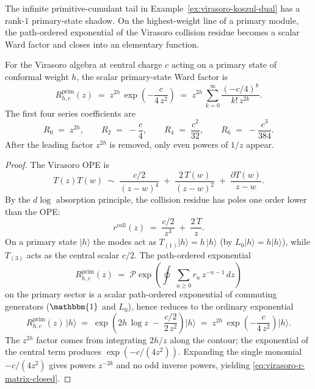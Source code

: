 The infinite primitive-cumulant tail in
Example~\ref{ex:virasoro-koszul-dual} has a rank-$1$ primary-state
shadow. On the highest-weight line of a primary module, the
path-ordered exponential of the Virasoro collision residue becomes a
scalar Ward factor and closes into an elementary function.

\begin{computation}
\label{comp:virasoro-spectral-r-matrix}
For the Virasoro algebra at central charge $c$ acting on a
primary state of conformal weight $h$, the scalar primary-state
Ward factor is
\begin{equation}
\label{eq:virasoro-r-matrix-closed}
R^{\mathrm{prim}}_{h,c}(z)
\;=\; z^{2h}\,\exp\!\left(-\frac{c}{4\,z^{2}}\right)
 \;=\; z^{2h}\,\sum_{k=0}^{\infty}
 \frac{(-c/4)^{k}}{k!\,z^{2k}}.
\end{equation}
The first four series coefficients are
\[
 R_0 \;=\; z^{2h},
 \qquad
 R_2 \;=\; -\frac{c}{4},
 \qquad
 R_4 \;=\; \frac{c^{2}}{32},
 \qquad
 R_6 \;=\; -\frac{c^{3}}{384}.
\]
After the leading factor $z^{2h}$ is removed, only even powers of
$1/z$ appear.
\end{computation}

\begin{proof}
The Virasoro OPE is
\[
 T(z)T(w) \;\sim\; \frac{c/2}{(z-w)^{4}}
 \;+\; \frac{2\,T(w)}{(z-w)^{2}}
 \;+\; \frac{\partial T(w)}{z-w}.
\]
By the $d\log$ absorption principle, the collision residue has
poles one order lower than the OPE:
\[
 r^{\mathrm{coll}}(z) \;=\; \frac{c/2}{z^{3}} \;+\; \frac{2\,T}{z}.
\]
On a primary state $\lvert h\rangle$ the modes act as
$T_{(1)}\lvert h\rangle = h\,\lvert h\rangle$ (by
$L_{0}\lvert h\rangle = h\lvert h\rangle$), while $T_{(3)}$
acts as the central scalar $c/2$. The path-ordered exponential
\[
 R^{\mathrm{prim}}_{h,c}(z)
 \;=\; \mathcal{P}\exp\!\left(\oint\;\sum_{n\geq 0}
 r_{n}\,z^{-n-1}\,dz\right)
\]
on the primary sector is a scalar path-ordered exponential of
commuting generators ($\mathbbm{1}$ and $L_{0}$), hence reduces
to the ordinary exponential
\[
 R^{\mathrm{prim}}_{h,c}(z)\,\lvert h\rangle
 \;=\; \exp\!\left(2h\,\log z \;-\; \frac{c/2}{2\,z^{2}}\right)
 \lvert h\rangle
 \;=\; z^{2h}\,\exp\!\left(-\frac{c}{4\,z^{2}}\right)
 \lvert h\rangle.
\]
The $z^{2h}$ factor comes from integrating $2h/z$ along the
contour; the exponential of the central term produces
$\exp(-c/(4z^{2}))$. Expanding the single monomial
$-c/(4z^2)$ gives powers $z^{-2k}$ and no odd inverse powers,
yielding \eqref{eq:virasoro-r-matrix-closed}.
\end{proof}

